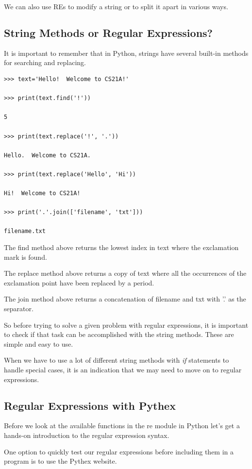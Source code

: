 \documentclass{article}
\begin{document}
We can also use REs to modify a string or to split it apart in various ways.

\subsection{String Methods or Regular Expressions?}
It is important to remember that in Python, strings have several built-in methods for searching and replacing.

\begin{lstlisting}
>>> text='Hello!  Welcome to CS21A!'

>>> print(text.find('!'))

5

>>> print(text.replace('!', '.'))

Hello.  Welcome to CS21A.

>>> print(text.replace('Hello', 'Hi'))

Hi!  Welcome to CS21A!

>>> print('.'.join(['filename', 'txt']))

filename.txt
\end{lstlisting}

The find method above returns the lowest index in text where the exclamation mark is found. 

The replace method above returns a copy of text where all the occurrences of the exclamation point have been replaced by a period.

The join method above returns a concatenation of filename and txt with '.' as the separator.

So before trying to solve a given problem with regular expressions, it is important to check if that task can be accomplished with the string methods. These are simple and easy to use.

When we have to use a lot of different string methods with \textit{if} statements to handle special cases, it is an indication that we may need to move on to regular expressions.

\subsection{Regular Expressions with Pythex}
Before we look at the available functions in the re module in Python let’s get a hands-on introduction to the regular expression syntax.

One option to quickly test our regular expressions before including them in a program is to use the Pythex website.
\end{document}
